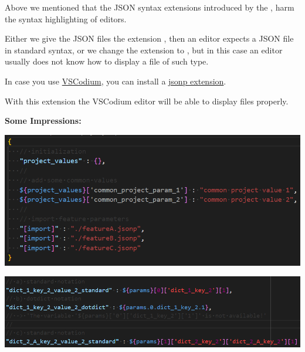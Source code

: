 Above we mentioned that the JSON syntax extensions introduced by the \pkg, harm the syntax highlighting of editors.

Either we give the JSON files the extension , then an editor expects a JSON file in standard syntax,
or we change the extension to , but in this case an editor usually does not know how to display a file of such type.

In case you use \href{https://vscodium.com/}{VSCodium}, you can install a
\href{https://github.com/test-fullautomation/vscode-jsonp}{jsonp extension}. 

With this extension the VSCodium editor will be able to display  files properly.

\vspace{2ex}

\textbf{Some Impressions:}

\includegraphics{./pictures/screenshot1.png}

\vspace{2ex}

\includegraphics{./pictures/screenshot2.png}







